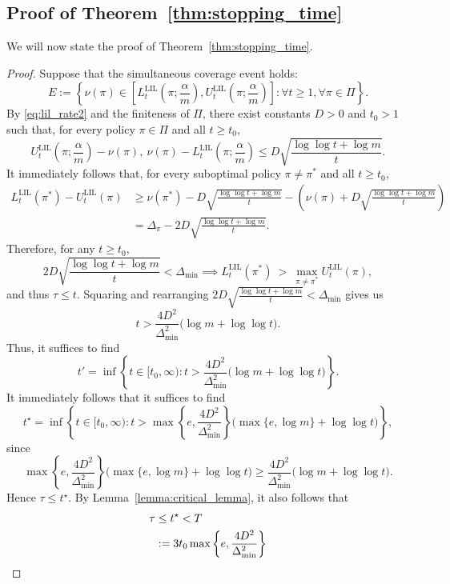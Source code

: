 \documentclass[11pt]{article}
\newcommand{\LIL}{\mathrm{LIL}}
\begin{document}
\subsection{Proof of Theorem~\ref{thm:stopping_time}}

We will now state the proof of Theorem~\ref{thm:stopping_time}.

\begin{proof}
Suppose that the simultaneous coverage event holds:
\[
E := \left\{\nu(\pi) \in \left[L_t^\LIL\left(\pi; \frac{\alpha}{m}\right), U_t^\LIL\left(\pi; \frac{\alpha}{m}\right)\right]: \forall t \ge 1, \forall \pi \in \Pi \right\}.
\]
By \eqref{eq:lil_rate2} and the finiteness of $\Pi$, there exist constants $D>0$ and $t_0 > 1$ such that, for every policy $\pi \in \Pi$ and all $t \ge t_0$,
\[
U_t^{\LIL}\left(\pi; \frac{\alpha}{m}\right) - \nu(\pi), \ \nu(\pi) - L_t^{\LIL}\left(\pi; \frac{\alpha}{m}\right)
\le
D\sqrt{\frac{\log\log t+\log m}{t}}.
\]
It immediately follows that, for every suboptimal policy $\pi \neq \pi^*$ and all $t \ge t_0$,
\begin{align*}
L_t^{\LIL}(\pi^*)
-
U_t^{\LIL}(\pi)
&\ge
\nu(\pi^*)
-
D\sqrt{\frac{\log\log t+\log m}{t}}
-
\left(
\nu(\pi)+
D\sqrt{\frac{\log\log t+\log m}{t}}
\right) \\
&=
\Delta_\pi - 2D\sqrt{\frac{\log\log t+\log m}{t}}.
\end{align*}
Therefore, for any $t \ge t_0$,
\[
2D\sqrt{\frac{\log\log t+\log m}{t}} < \Delta_{\min}
\implies
L_t^{\LIL}(\pi^*)\ >\ \max_{\pi \neq \pi^*} U_t^{\LIL}(\pi),
\]
and thus $\tau \le t$. Squaring and rearranging $2D\sqrt{\frac{\log\log t+\log m}{t}} < \Delta_{\min}$ gives us
\[
t>\frac{4D^2}{\Delta_{\min}^2}\bigl(\log m+\log\log t\bigr).
\]
Thus, it suffices to find
\[
t' = \inf\left\{ t \in [t_0, \infty): t > \frac{4D^2}{\Delta_{\min}^2}\bigl(\log m + \log\log t\bigr) \right\}.
\]
It immediately follows that it suffices to find
\[
t^\star = \inf\left\{ t \in [t_0, \infty): t > \max\left\{e, \frac{4D^2}{\Delta_{\min}^2}\right\}\bigl(\max\{e, \log m\} + \log\log t\bigr) \right\},
\]
since
\[
\max\left\{e, \frac{4D^2}{\Delta_{\min}^2}\right\}\bigl(\max\{e, \log m\} + \log\log t\bigr)
\ge
\frac{4D^2}{\Delta_{\min}^2}\bigl(\log m + \log\log t\bigr).
\]
Hence $\tau \le t^\star$. By Lemma~\ref{lemma:critical_lemma}, it also follows that
\begin{align}
\tau
&\le t^\star < T \notag\\
&:= 3t_0\max\left\{e, \frac{4D^2}{\Delta_{\min}^2}\right\}

\end{align}
\end{proof}
\end{document}
